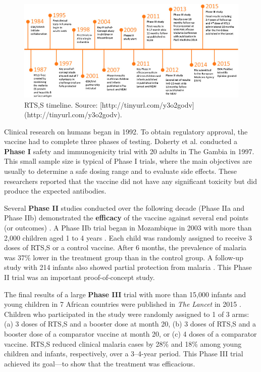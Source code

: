 \documentclass[justified,twoside,symmetric,]{tufte-book}
\renewcommand*{\citep}[1]{{\cite{#1}}}
\begin{document}
\begin{figure}
\includegraphics{images/rtss} \caption[RTS,S timeline]{RTS,S timeline. Source: [http://tinyurl.com/y3o2godv](http://tinyurl.com/y3o2godv).}\label{fig:rtss}
\end{figure}

Clinical research on humans began in 1992. To obtain regulatory approval, the vaccine had to complete three phases of testing. Doherty et al. \citeyearpar{doherty:1999} conducted a \textbf{Phase I} safety and immunogenicity trial with 20 adults in The Gambia in 1997. This small sample size is typical of Phase I trials, where the main objectives are usually to determine a safe dosing range and to evaluate side effects. These researchers reported that the vaccine did not have any significant toxicity but did produce the expected antibodies.

Several \textbf{Phase II} studies conducted over the following decade (Phase IIa and Phase IIb) demonstrated the \textbf{efficacy} of the vaccine against several end points (or outcomes) \citep{moorthy:2009}. A Phase IIb trial began in Mozambique in 2003 with more than 2,000 children aged 1 to 4 years \citep{alonso:2004}. Each child was randomly assigned to receive 3 doses of RTS,S or a control vaccine. After 6 months, the prevalence of malaria was 37\% lower in the treatment group than in the control group. A follow-up study with 214 infants also showed partial protection from malaria \citep{aponte:2007}. This Phase II trial was an important proof-of-concept study.

The final results of a large \textbf{Phase III} trial with more than 15,000 infants and young children in 7 African countries were published in \emph{The Lancet} in 2015 \citep{rts:2015}. Children who participated in the study were randomly assigned to 1 of 3 arms: (a) 3 doses of RTS,S and a booster dose at month 20, (b) 3 doses of RTS,S and a booster dose of a comparator vaccine at month 20, or (c) 4 doses of a comparator vaccine. RTS,S reduced clinical malaria cases by 28\% and 18\% among young children and infants, respectively, over a 3--4-year period. This Phase III trial achieved its goal---to show that the treatment was efficacious.
\end{document}
